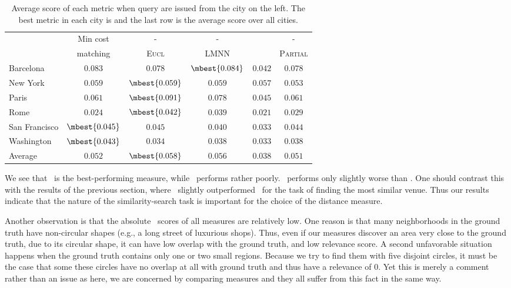 \begin{table}[t]
	\centering
	\begin{tabular}{lccccc}
		\toprule
								& Min cost        & \emd-           & \emd-           & \jsd    & \emd- \\
								& matching        & \textsc{Eucl}   & LMNN            &         & \textsc{Partial} \\
		\midrule
		Barcelona               & $0.083$         & $0.078$         & $\mbest{0.084}$ & $0.042$ & $0.078$ \\
		New York                & $0.059$         & $\mbest{0.059}$ & $0.059$         & $0.057$ & $0.053$\\
		Paris                   & $0.061$         & $\mbest{0.091}$ & $0.078$         & $0.045$ & $0.061$\\
		Rome                    & $0.024$         & $\mbest{0.042}$ & $0.039$         & $0.021$ & $0.029$\\
		San Francisco           & $\mbest{0.045}$ & $0.045$         & $0.040$         & $0.033$ & $0.044$\\
		Washington              & $\mbest{0.043}$ & $0.034$         & $0.038$         & $0.033$ & $0.038$\\
		\midrule
		Average                 & $0.052$         & $\mbest{0.058}$ & $0.056$         & $0.038$ & $0.051$\\
		\bottomrule
	\end{tabular}
	\caption[Average score of each metric]{Average score of each metric when query
		are issued from the city on the left. The best metric in each city is
		 and the last row is the average score over all
	cities.\label{tab:distance-comparisons}}
\end{table}

We see that \emde\ is the best-performing measure, while \jsd\ performs rather
poorly.  \emdl\ performs only slightly worse than \emde.  One should contrast
this with the results of the previous section, where \lmnn\ slightly
outperformed \eucl\ for the task of finding the most similar venue.  Thus our
results indicate that the nature of the similarity-search task is important for
the choice of the distance measure.

Another observation is that the absolute \dcg\ scores of all measures are
relatively low.  One reason is that many neighborhoods in the ground truth have
non-circular shapes (e.g., a long street of luxurious shops).  Thus, even if
our measures discover an area very close to the ground truth, due to its
circular shape, it can have low overlap with the ground truth, and low
relevance score. A second unfavorable situation happens when the ground truth
contains only one or two small regions. Because we try to find them with five
disjoint circles, it must be the case that some these circles have no overlap
at all with ground truth and thus have a relevance of 0.  Yet this is merely a
comment rather than an issue as here, we are concerned by comparing measures
and they all suffer from this fact in the same way.
